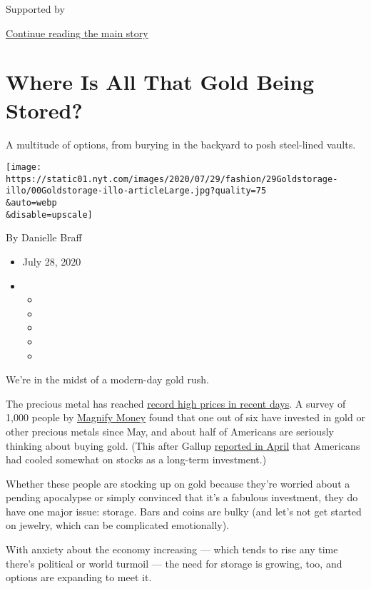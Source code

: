 Supported by

\protect\hyperlink{after-sponsor}{Continue reading the main story}

\hypertarget{where-is-all-that-gold-being-stored}{%
\section{Where Is All That Gold Being
Stored?}\label{where-is-all-that-gold-being-stored}}

A multitude of options, from burying in the backyard to posh steel-lined
vaults.

\texttt{[image: https://static01.nyt.com/images/2020/07/29/fashion/29Goldstorage-illo/00Goldstorage-illo-articleLarge.jpg?quality=75\\\&auto=webp\\\&disable=upscale]}

By Danielle Braff

\begin{itemize}
\item
  July 28, 2020
\item
  \begin{itemize}
  \item
  \item
  \item
  \item
  \item
  \end{itemize}
\end{itemize}

We're in the midst of a modern-day gold rush.

The precious metal has reached
\href{https://www.nytimes.com/2020/07/27/business/gold-prices-record-high.html}{record
high prices in recent days}. A survey of 1,000 people by
\href{https://www.magnifymoney.com}{Magnify Money} found that one out of
six have invested in gold or other precious metals since May, and about
half of Americans are seriously thinking about buying gold. (This after
Gallup
\href{https://news.gallup.com/poll/309233/stock-investments-lose-luster-covid-sell-off.aspx}{reported
in April} that Americans had cooled somewhat on stocks as a long-term
investment.)

Whether these people are stocking up on gold because they're worried
about a pending apocalypse or simply convinced that it's a fabulous
investment, they do have one major issue: storage. Bars and coins are
bulky (and let's not get started on jewelry, which can be complicated
emotionally).

With anxiety about the economy increasing --- which tends to rise any
time there's political or world turmoil --- the need for storage is
growing, too, and options are expanding to meet it.

